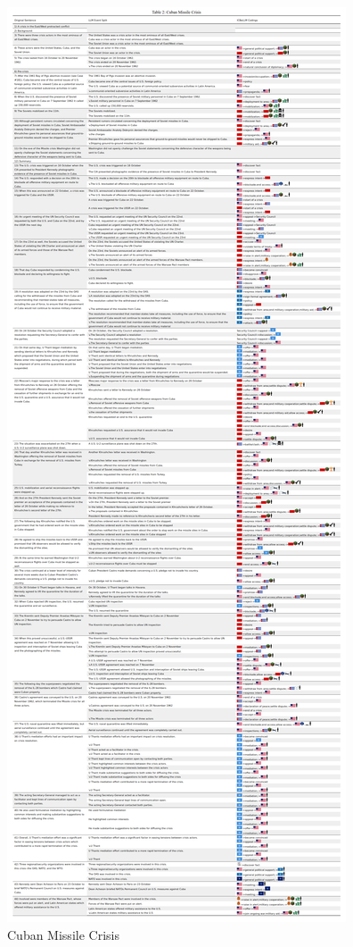 \documentclass[
]{article}
\begin{document}
\begin{figure}[H]

{\centering \includegraphics{Figure1_Cuban_Missile_Crisis3.png}

}

\caption{Cuban Missile Crisis}

\end{figure}%
\end{document}
